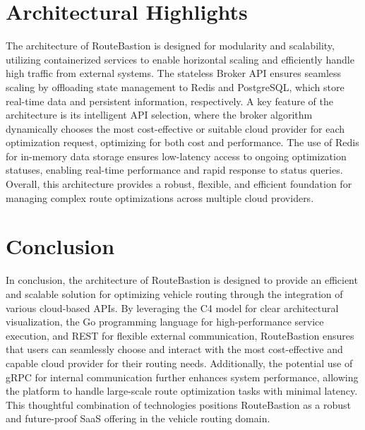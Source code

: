 \documentclass[english,notblind]{sbc20}
\begin{document}
\section{Architectural Highlights}
\label{sec:architectural_highlights}
The architecture of RouteBastion is designed for modularity and scalability, utilizing containerized services to enable horizontal scaling and efficiently handle high traffic from external systems. The stateless Broker API ensures seamless scaling by offloading state management to Redis and PostgreSQL, which store real-time data and persistent information, respectively. A key feature of the architecture is its intelligent API selection, where the broker algorithm dynamically chooses the most cost-effective or suitable cloud provider for each optimization request, optimizing for both cost and performance. The use of Redis for in-memory data storage ensures low-latency access to ongoing optimization statuses, enabling real-time performance and rapid response to status queries. Overall, this architecture provides a robust, flexible, and efficient foundation for managing complex route optimizations across multiple cloud providers.

\section{Conclusion}
In conclusion, the architecture of RouteBastion is designed to provide an efficient and scalable solution for optimizing vehicle routing through the integration of various cloud-based APIs. By leveraging the C4 model for clear architectural visualization, the Go programming language for high-performance service execution, and REST for flexible external communication, RouteBastion ensures that users can seamlessly choose and interact with the most cost-effective and capable cloud provider for their routing needs. Additionally, the potential use of gRPC for internal communication further enhances system performance, allowing the platform to handle large-scale route optimization tasks with minimal latency. This thoughtful combination of technologies positions RouteBastion as a robust and future-proof SaaS offering in the vehicle routing domain.







\end{document}
